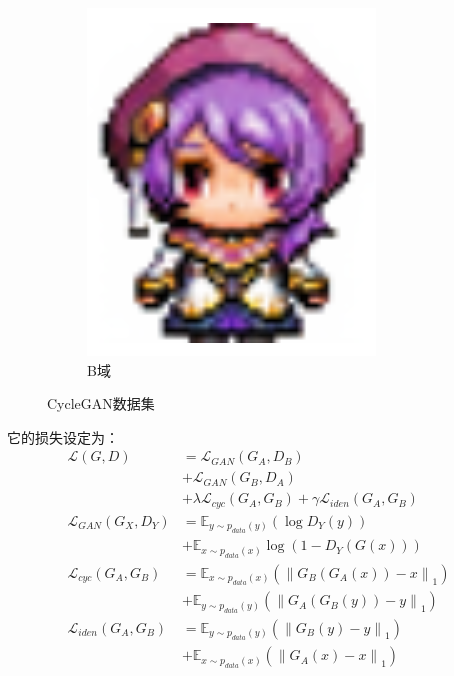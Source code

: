 \documentclass[twocolumn,11pt]{ctexart}
\newcommand\norm[1]{\left\lVert#1\right\rVert}
\begin{document}
\begin{figure}[htb]
\begin{subfigure}[b]{0.3\linewidth}
        \includegraphics[width=\linewidth]{bigsprite.png}
        \caption{B域}
      \end{subfigure}
      \caption{CycleGAN数据集}
      \label{fig:hp2sprite}
\end{figure}

它的损失设定为：
\begin{align*}
\mathcal{L}(G,D) &= \mathcal{L}_{GAN}(G_A,D_B) \\
                             &+ \mathcal{L}_{GAN}(G_B,D_A) \\
                             &+ \lambda \mathcal{L}_{cyc}(G_A,G_B) + \gamma \mathcal{L}_{iden}(G_A,G_B) \\
  \mathcal{L}_{GAN}(G_X,D_Y) &= \mathbb{E}_{y\sim p_{data}(y)}(\log D_Y(y))  \\
                             &+ \mathbb{E}_{x \sim p_{data}(x)} \log(1-D_Y(G(x)))  \\
  \mathcal{L}_{cyc}(G_A,G_B) &= \mathbb{E}_{x\sim p_{data}(x)} (\norm{G_B(G_A(x)) - x}_1) \\
                             &+ \mathbb{E}_{y\sim p_{data}(y)} (\norm{G_A(G_B(y)) - y}_1) \\
 \mathcal{L}_{iden}(G_A,G_B) &= \mathbb{E}_{y \sim p_{data}(y)}(\norm{G_B(y)-y}_1) \\
                             &+ \mathbb{E}_{x \sim p_{data}(x)}(\norm{G_A(x)-x}_1)
\end{align*}
\end{document}
